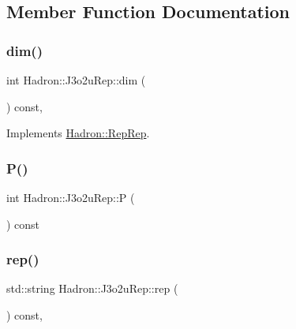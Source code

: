 \subsection{Member Function Documentation}
\mbox{\label{structHadron_1_1J3o2uRep_a02d95a2eb65dcc65b2e8904496fbe0b4}} 
\subsubsection{\texorpdfstring{dim()}{dim()}}
{\footnotesize\ttfamily int Hadron\+::\+J3o2u\+Rep\+::dim (\begin{DoxyParamCaption}{ }\end{DoxyParamCaption}) const\hspace{0.3cm}{\ttfamily [inline]}, {\ttfamily [virtual]}}



Implements \mbox{\hyperlink{structHadron_1_1RepRep_a92c8802e5ed7afd7da43ccfd5b7cd92b}{Hadron\+::\+Rep\+Rep}}.

\mbox{\label{structHadron_1_1J3o2uRep_a9e81ffb5181e3276f1e607a3fa90d62a}} 
\subsubsection{\texorpdfstring{P()}{P()}}
{\footnotesize\ttfamily int Hadron\+::\+J3o2u\+Rep\+::P (\begin{DoxyParamCaption}{ }\end{DoxyParamCaption}) const\hspace{0.3cm}{\ttfamily [inline]}}

\mbox{\label{structHadron_1_1J3o2uRep_aa8a4755a7dfd43ada92526d1e9a3c370}} 
\subsubsection{\texorpdfstring{rep()}{rep()}}
{\footnotesize\ttfamily std\+::string Hadron\+::\+J3o2u\+Rep\+::rep (\begin{DoxyParamCaption}{ }\end{DoxyParamCaption}) const\hspace{0.3cm}{\ttfamily [inline]}, {\ttfamily [virtual]}}



